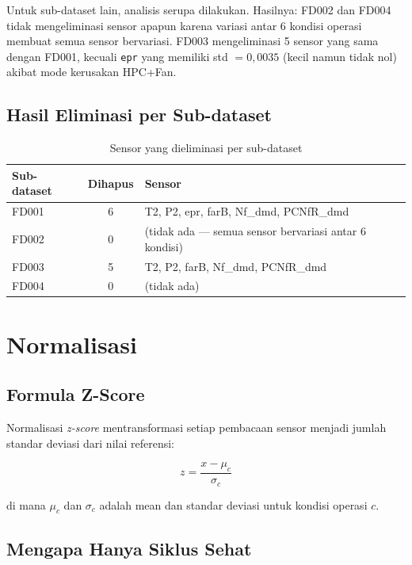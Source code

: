 \documentclass[11pt,a4paper]{article}
\begin{document}
Untuk sub-dataset lain, analisis serupa dilakukan. Hasilnya:
FD002 dan FD004 tidak mengeliminasi sensor apapun karena variasi antar
6 kondisi operasi membuat semua sensor bervariasi.
FD003 mengeliminasi 5 sensor yang sama dengan FD001, kecuali \texttt{epr}
yang memiliki std $= 0{,}0035$ (kecil namun tidak nol) akibat mode kerusakan
HPC+Fan.

\subsection{Hasil Eliminasi per Sub-dataset}

\begin{table}[H]
\centering\small
\caption{Sensor yang dieliminasi per sub-dataset}
\label{tab:drop}
\begin{tabular}{lcp{8cm}}
\toprule
Sub-dataset & Dihapus & Sensor \\
\midrule
FD001 & 6 & T2, P2, epr, farB, Nf\_dmd, PCNfR\_dmd \\
FD002 & 0 & (tidak ada --- semua sensor bervariasi antar 6 kondisi) \\
FD003 & 5 & T2, P2, farB, Nf\_dmd, PCNfR\_dmd \\
FD004 & 0 & (tidak ada) \\
\bottomrule
\end{tabular}
\end{table}

\section{Normalisasi}

\subsection{Formula Z-Score}

Normalisasi \textit{z-score} mentransformasi setiap pembacaan sensor menjadi
jumlah standar deviasi dari nilai referensi:

\begin{equation}
  z = \frac{x - \mu_c}{\sigma_c}
  \label{eq:zscore}
\end{equation}

di mana $\mu_c$ dan $\sigma_c$ adalah mean dan standar deviasi untuk
kondisi operasi $c$.

\subsection{Mengapa Hanya Siklus Sehat}
\end{document}

